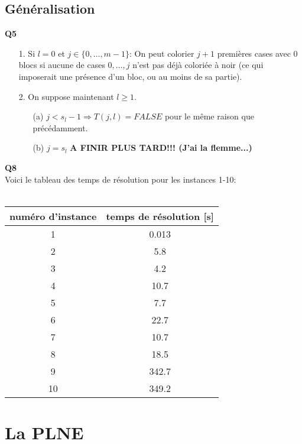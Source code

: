 \documentclass[10pt,a4paper]{article}
\begin{document}
\subsection{Généralisation}
\noindent\textbf{Q5} \\
\begin{itemize}
	\item[1.] Si $l = 0$ et $j \in \lbrace 0, \hdots, m-1 \rbrace$: On peut colorier $j+1$ premières cases avec 0 blocs si aucune de cases $0, \hdots, j$ n'est pas déjà coloriée à noir (ce qui imposerait une présence d'un bloc, ou au moins de sa partie). \\
	\item[2.] On suppose maintenant $l \geq 1$.
	\begin{itemize}
		\item[(a)] $j < s_l - 1 \Rightarrow T(j,l) = FALSE $ pour le même raison que précédamment.
		\item[(b)] $j = s_l$ \textbf{A FINIR PLUS TARD!!! (J'ai la flemme...)}
	\end{itemize}
\end{itemize}
\noindent 
\textbf{Q8}
\\
\noindent
Voici le tableau des temps de résolution pour les instances 1-10: \\ \\
\begin{tabular}{|c|c|}
\hline
numéro d'instance & temps de résolution [s]\\
\hline
\hline
1  & 0.013\\
\hline
2 & 5.8\\
\hline
3 & 4.2\\
\hline
4 & 10.7\\
\hline
5 & 7.7\\
\hline
6 & 22.7\\
\hline
7 & 10.7\\
\hline
8 & 18.5\\
\hline
9 & 342.7\\
\hline
10 & 349.2\\
\hline
\end{tabular}
\newpage
\section{La PLNE}
\end{document}
